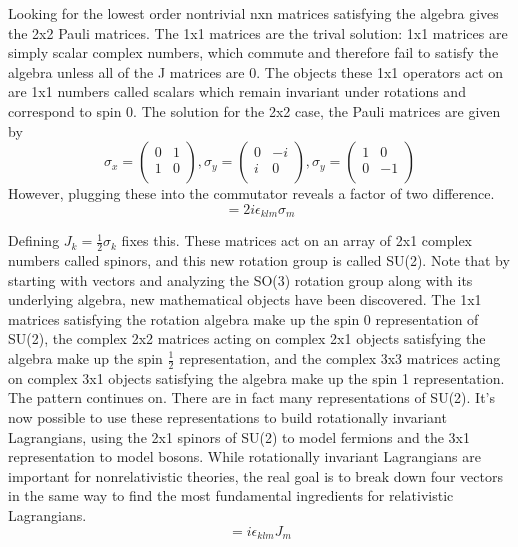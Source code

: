 Looking for the lowest order nontrivial nxn matrices satisfying the algebra gives the 2x2 Pauli matrices. The 1x1 matrices are the trival solution: 1x1 matrices are simply scalar complex numbers, which commute and therefore fail to satisfy the algebra unless all of the J matrices are 0. The objects these 1x1 operators act on are 1x1 numbers called scalars which remain invariant under rotations and correspond to spin 0. The solution for the 2x2 case, the Pauli matrices are given by
\begin{equation}
\sigma_x = 
\begin{pmatrix}
0 & 1 \\
1 & 0 \\
\end{pmatrix},
\sigma_y = 
\begin{pmatrix}
0 & -i \\
i & 0 \\
\end{pmatrix},
\sigma_y = 
\begin{pmatrix}
1 & 0 \\
0 & -1 \\
\end{pmatrix}
\end{equation}
However, plugging these into the commutator reveals a factor of two difference.
\begin{equation}
[\sigma_k, \sigma_l] = 2i\epsilon_{klm}\sigma_m
\end{equation}

Defining $J_k = \frac{1}{2} \sigma_k$ fixes this. These matrices act on an array of 2x1 complex numbers called spinors, and this new rotation group is called SU(2). Note that by starting with vectors and analyzing the SO(3) rotation group along with its underlying algebra, new mathematical objects have been discovered. The 1x1 matrices satisfying the rotation algebra make up the spin 0 representation of SU(2), the complex 2x2 matrices acting on complex 2x1 objects satisfying the algebra make up the spin $\frac{1}{2}$ representation, and the complex 3x3 matrices acting on complex 3x1 objects satisfying the algebra make up the spin 1 representation. The pattern continues on. There are in fact many representations of SU(2). It's now possible to use these representations to build rotationally invariant Lagrangians, using the 2x1 spinors of SU(2) to model fermions and the 3x1 representation to model bosons. While rotationally invariant Lagrangians are important for nonrelativistic theories, the real goal is to break down four vectors in the same way to find the most fundamental ingredients for relativistic Lagrangians. 
\begin{equation}
[J_k, J_l] = i\epsilon_{klm}J_m
\end{equation}


